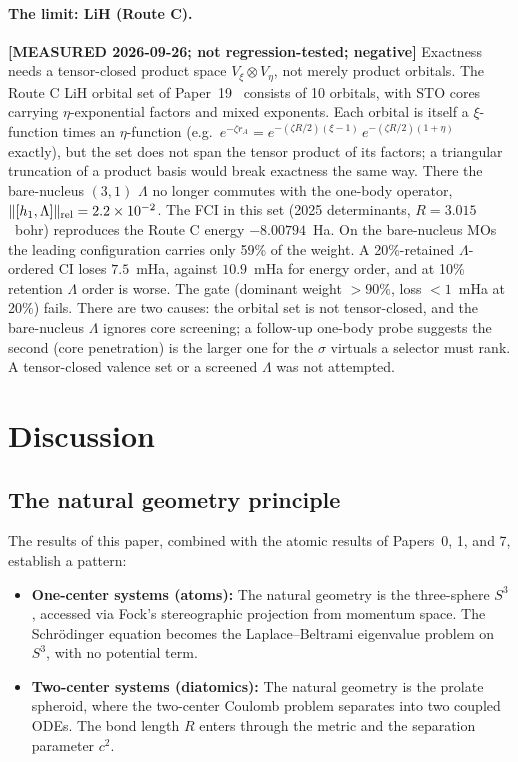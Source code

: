 \documentclass[aps,pra,twocolumn,superscriptaddress,longbibliography]{revtex4-2}
\begin{document}
\paragraph{The limit: LiH (Route C).}
\textbf{[MEASURED 2026-09-26; not regression-tested; negative]}
Exactness needs a tensor-closed product space $V_\xi\otimes V_\eta$,
not merely product orbitals. The Route C LiH orbital set of
Paper~19~\cite{loutey_paper19} consists of 10 orbitals, with STO cores
carrying $\eta$-exponential factors and mixed exponents. Each orbital
is itself a $\xi$-function times an $\eta$-function (e.g.\
$e^{-\zeta r_A} = e^{-(\zeta R/2)(\xi-1)}\,e^{-(\zeta R/2)(1+\eta)}$
exactly), but the set does not span the tensor product of its factors;
a triangular truncation of a product basis would break exactness the
same way. There the bare-nucleus $(3,1)$ $\Lambda$ no longer
commutes with the one-body operator, $\|[h_1,\Lambda]\|_{\rm rel} =
2.2\times10^{-2}$. The FCI in this set (2025 determinants,
$R = 3.015$~bohr) reproduces the Route C energy $-8.00794$~Ha. On the
bare-nucleus MOs the leading configuration carries only 59\% of the
weight. A 20\%-retained $\Lambda$-ordered CI loses $7.5$~mHa, against
$10.9$~mHa for energy order, and at 10\% retention $\Lambda$ order is
worse. The gate (dominant weight $>90\%$, loss $<1$~mHa at 20\%) fails.
There are two causes: the orbital set is not tensor-closed, and
the bare-nucleus $\Lambda$ ignores core screening; a follow-up one-body
probe suggests the second (core penetration) is the larger one for the
$\sigma$ virtuals a selector must rank. A tensor-closed valence set or a
screened $\Lambda$ was not attempted.


\section{Discussion}
\label{sec:discussion}

\subsection{The natural geometry principle}

The results of this paper, combined with the atomic results of
Papers~0, 1, and 7, establish a pattern:

\begin{itemize}
  \item \textbf{One-center systems (atoms):} The natural geometry
    is the three-sphere $S^3$, accessed via Fock's stereographic
    projection from momentum space.  The Schr\"odinger equation
    becomes the Laplace--Beltrami eigenvalue problem on $S^3$,
    with no potential term.
  \item \textbf{Two-center systems (diatomics):} The natural
    geometry is the prolate spheroid, where the two-center Coulomb
    problem separates into two coupled ODEs.  The bond length $R$
    enters through the metric and the separation parameter $c^2$.
\end{itemize}
\end{document}
